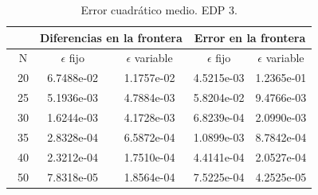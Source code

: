\documentclass[11pt,a4paper]{article}
\begin{document}
\begin{table}
\caption{Error cuadrático medio. EDP 3.}
\centering
\begin{tabular}{|c|cc|cc|}
\hline
\   & \multicolumn{2}{c|}{Diferencias en la frontera} & \multicolumn{2}{c|}{Error en la frontera} \\
\hline
\ N & $\epsilon$ fijo & $\epsilon$ variable & $\epsilon$ fijo & $\epsilon$ variable \\
\hline
\ 20 & 6.7488e-02 & 1.1757e-02 & 4.5215e-03& 1.2365e-01 \\
\ 25 & 5.1936e-03& 4.7884e-03&  5.8204e-02&  9.4766e-03\\
 \ 30 & 1.6244e-03& 4.1728e-03& 6.8239e-04 & 2.0990e-03 \\
 \ 35 &2.8328e-04& 6.5872e-04 &  1.0899e-03& 8.7842e-04 \\
 \ 40  & 2.3212e-04& 1.7510e-04 & 4.4141e-04 & 2.0527e-04 \\
 \ 50 &  7.8318e-05& 1.8564e-04 &7.5225e-04 & 4.2525e-05\\
 \hline
 \end{tabular}
 \end{table}
 
\end{document}
